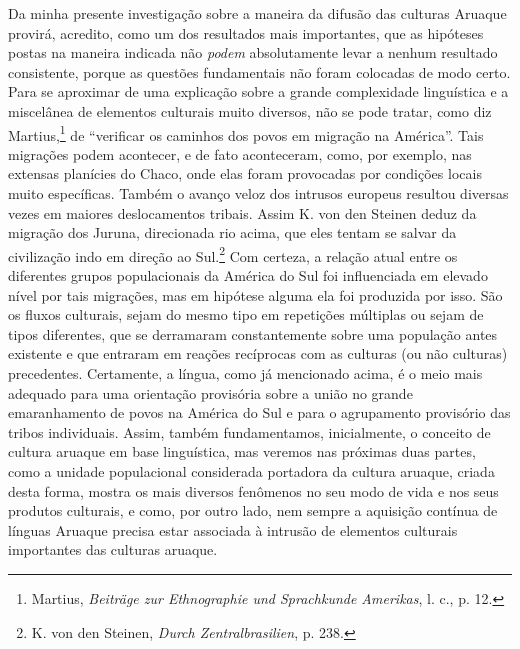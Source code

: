 Da minha presente investigação sobre a maneira da difusão das culturas
Aruaque provirá, acredito, como um dos resultados mais importantes, que
as hipóteses postas na maneira indicada não \emph{podem} absolutamente
levar a nenhum resultado consistente, porque as questões fundamentais
não foram colocadas de modo certo. Para se aproximar de uma explicação
sobre a grande complexidade linguística e a miscelânea de elementos
culturais muito diversos, não se pode tratar, como diz Martius,\footnote{Martius,
  \emph{Beiträge zur Ethnographie und Sprachkunde Amerikas}, l. c., p.
  12.} de ``verificar os caminhos dos povos em migração na América''.
Tais migrações podem acontecer, e de fato aconteceram, como, por
exemplo, nas extensas planícies do Chaco, onde elas foram provocadas por
condições locais muito específicas. Também o avanço veloz dos intrusos
europeus resultou diversas vezes em maiores deslocamentos tribais.
Assim K. von den Steinen deduz da migração dos Juruna, direcionada rio
acima, que eles tentam se salvar da civilização indo em direção ao
Sul.\footnote{K. von den Steinen, \emph{Durch Zentralbrasilien}, p. 238.}
Com certeza, a relação atual entre os diferentes grupos populacionais da
América do Sul foi influenciada em elevado nível por tais migrações, mas
em hipótese alguma ela foi produzida por isso. São os fluxos culturais,
sejam do mesmo tipo em repetições múltiplas ou sejam de tipos
diferentes, que se derramaram constantemente sobre uma população antes
existente e que entraram em reações recíprocas com as culturas (ou
não culturas) precedentes. Certamente, a língua, como já mencionado
acima, é o meio mais adequado para uma orientação provisória sobre a
união no grande emaranhamento de povos na América do Sul e para o
agrupamento provisório das tribos individuais. Assim, também
fundamentamos, inicialmente, o conceito de cultura aruaque em base
linguística, mas veremos nas próximas duas partes, como a unidade
populacional considerada portadora da cultura aruaque, criada desta
forma, mostra os mais diversos fenômenos no seu modo de vida e nos seus
produtos culturais, e como, por outro lado, nem sempre a aquisição
contínua de línguas Aruaque precisa estar associada à intrusão de
elementos culturais importantes das culturas aruaque.


